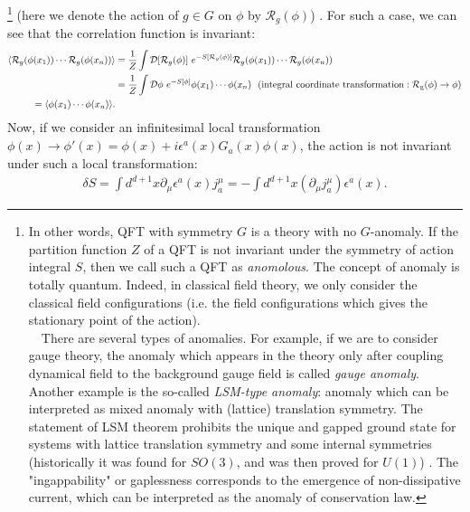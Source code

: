 \documentclass{ltjsarticle}
\theoremstyle{mystyle} %
\numberwithin{equation}{section}
\begin{document}
\footnote{In other words, QFT with symmetry $G$ is a theory with no $G$-anomaly. 
If the partition function $Z$ of a QFT is not invariant under the symmetry of action integral $S$, 
then we call such a QFT as \textit{anomolous}. 
The concept of anomaly is totally quantum. Indeed, 
in classical field theory, we only consider the classical field configurations (i.e. 
the field configurations which gives the stationary point of the action). \\
　There are several types of anomalies. For example, 
if we are to consider gauge theory, 
the anomaly which appears in the theory only after coupling dynamical field to the background gauge field 
is called \textit{gauge anomaly}. 
Another example is the so-called \textit{LSM-type anomaly}: 
anomaly which can be interpreted as mixed anomaly with (lattice) translation symmetry. 
The statement of LSM theorem prohibits the unique and gapped ground state for systems with lattice translation symmetry and some internal symmetries 
(historically it was found for $SO(3)$, and was then proved for $U(1)$)
\cite{HW}. 
The "ingappability" or gaplessness corresponds to the emergence of non-dissipative current, which can be interpreted as the anomaly of conservation law. 
} 
(here we denote the action of $g\in G$ on $\phi$ by $\mathcal{R}_g(\phi)$) . 
For such a case, we can see that the correlation function is invariant: 
\begin{align}
    \langle{\mathcal{R}_g(\phi(x_1))\cdots \mathcal{R}_g(\phi(x_n))}\rangle
    &=\frac{1}{Z}\int \mathcal{D}{[\mathcal{R}_g(\phi)]}~ e^{-S[\mathcal{R}_g(\phi)]}\mathcal{R}_g(\phi(x_1))\cdots \mathcal{R}_g(\phi(x_n))\\
    &=\frac{1}{Z}\int \mathcal{D}{\phi}~ e^{-S[\phi]}\phi(x_1)\cdots \phi(x_n)~~
    (\mathrm{integral~coordinate~transformation: \mathcal{R}_g(\phi)\to \phi})\\
    =\langle{\phi(x_1)\cdots \phi(x_n)}\rangle. 
\label{corrinv}
\end{align}
Now, if we consider an infinitesimal local transformation $\phi(x)\to \phi'(x) = \phi(x) + i\epsilon^a(x) G_a(x)\phi(x)$, 
the action is not invariant under such a local transformation: 
\begin{align}
    \delta S = \int d^{d+1}x \partial_\mu \epsilon^a(x)j^\mu_a
    =-\int d^{d+1}x (\partial_\mu j^\mu_a) \epsilon^a(x). 
\end{align}
\end{document}
